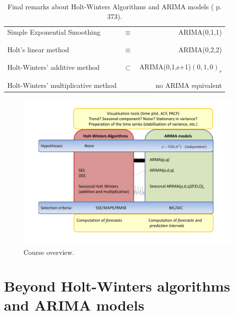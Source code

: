 \documentclass[a4paper,11pt,oneside,onecolumn]{book}
\begin{document}
\begin{table}[!h]
\begin{center}
\begin{tabular}{lcr}
Simple Exponential Smoothing &$\equiv$& ARIMA(0,1,1)\\
&&\\
\hline
&&\\
Holt's linear method &$\equiv$& ARIMA(0,2,2)\\
&&\\
\hline
&&\\
Holt-Winters' additive method & $\subset$ & ARIMA(0,1,s+1)$(0,1,0)_s$\\
&&\\
\hline
&&\\
Holt-Winters' multiplicative method && no ARIMA equivalent\\
\end{tabular}
\end{center}
\caption{Final remarks about Holt-Winters Algorithms and ARIMA models (\cite{Makridakis} p. 373).}
\label{tab:final}
\end{table}

\begin{figure}[!h]
\includegraphics[width=\linewidth]{ForecastingTOC.pdf}
\caption{Course overview.}
\label{fig:overview}
\end{figure}


\chapter{Beyond Holt-Winters algorithms and ARIMA models}
\end{document}
